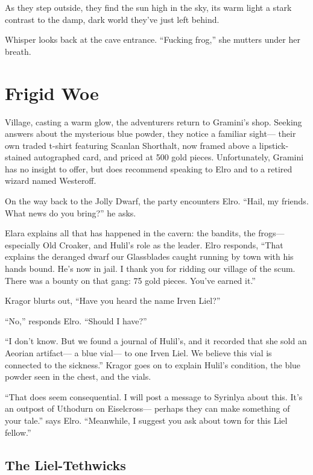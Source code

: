 \documentclass[
  letterpaper,12pt,twoside,twocolumn,openany,
  nodeprecatedcode,bg=full]{dndbook}
\begin{document}
As they step outside, they find the sun high in the sky, its warm light
a stark contrast to the damp, dark world they've just left behind.

Whisper looks back at the cave entrance. ``Fucking frog,'' she mutters
under her breath.

\chapter{Frigid Woe}\label{frigid-woe}

\hfill\break Village,
casting a warm glow, the adventurers return to Gramini's shop. Seeking
answers about the mysterious blue powder, they notice a familiar
sight--- their own traded t-shirt featuring Scanlan Shorthalt, now
framed above a lipstick-stained autographed card, and priced at 500 gold
pieces. Unfortunately, Gramini has no insight to offer, but does
recommend speaking to Elro and to a retired wizard named Westeroff.

On the way back to the Jolly Dwarf, the party encounters Elro. ``Hail,
my friends. What news do you bring?'' he asks.

Elara explains all that has happened in the cavern: the bandits, the
frogs--- especially Old Croaker, and Hulil's role as the leader. Elro
responds, ``That explains the deranged dwarf our Glassblades caught
running by town with his hands bound. He's now in jail. I thank you for
ridding our village of the scum. There was a bounty on that gang: 75
gold pieces. You've earned it.''

Kragor blurts out, ``Have you heard the name Irven Liel?''

``No,'' responds Elro. ``Should I have?''

``I don't know. But we found a journal of Hulil's, and it recorded that
she sold an Aeorian artifact--- a blue vial--- to one Irven Liel. We
believe this vial is connected to the sickness.'' Kragor goes on to
explain Hulil's condition, the blue powder seen in the chest, and the
vials.

``That does seem consequential. I will post a message to Syrinlya about
this. It's an outpost of Uthodurn on Eiselcross--- perhaps they can make
something of your tale.'' says Elro. ``Meanwhile, I suggest you ask
about town for this Liel fellow.''

\section{The Liel-Tethwicks}\label{the-liel-tethwicks}
\end{document}
